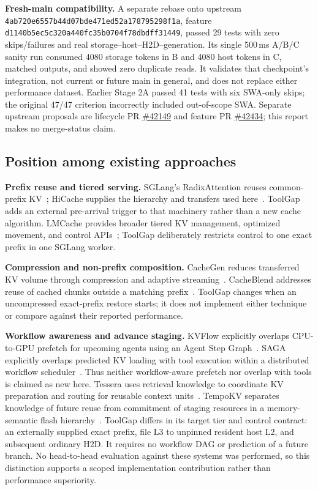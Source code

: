 \documentclass[10pt,a4paper]{article}
\begin{document}
\textbf{Fresh-main compatibility.} A separate rebase onto upstream \nolinkurl{4ab720e6557b44d07bde471ed52a178795298f1a}, feature \nolinkurl{d1140b5ec5c320a440fc35b0704f78dbdff31449}, passed 29 tests with zero skips/failures and real storage--host--H2D--generation. Its single 500\,ms A/B/C sanity run consumed 4080 storage tokens in B and 4080 host tokens in C, matched outputs, and showed zero duplicate reads. It validates that checkpoint's integration, not current or future main in general, and does not replace either performance dataset. Earlier Stage 2A passed 41 tests with six SWA-only skips; the original 47/47 criterion incorrectly included out-of-scope SWA. Separate upstream proposals are lifecycle PR \href{https://github.com/sgl-project/sglang/pull/42149}{\#42149} and feature PR \href{https://github.com/sgl-project/sglang/pull/42434}{\#42434}; this report makes no merge-status claim.

\subsection{Position among existing approaches}
\textbf{Prefix reuse and tiered serving.} SGLang's RadixAttention reuses common-prefix KV~\cite{sglang}; HiCache supplies the hierarchy and transfers used here~\cite{hicache}. ToolGap adds an external pre-arrival trigger to that machinery rather than a new cache algorithm. LMCache provides broader tiered KV management, optimized movement, and control APIs~\cite{lmcache}; ToolGap deliberately restricts control to one exact prefix in one SGLang worker.

\textbf{Compression and non-prefix composition.} CacheGen reduces transferred KV volume through compression and adaptive streaming~\cite{cachegen}. CacheBlend addresses reuse of cached chunks outside a matching prefix~\cite{cacheblend}. ToolGap changes when an uncompressed exact-prefix restore starts; it does not implement either technique or compare against their reported performance.

\textbf{Workflow awareness and advance staging.} KVFlow explicitly overlaps CPU-to-GPU prefetch for upcoming agents using an Agent Step Graph~\cite{kvflow}. SAGA explicitly overlaps predicted KV loading with tool execution within a distributed workflow scheduler~\cite{saga}. Thus neither workflow-aware prefetch nor overlap with tools is claimed as new here. Tessera uses retrieval knowledge to coordinate KV preparation and routing for reusable context units~\cite{tessera}. TempoKV separates knowledge of future reuse from commitment of staging resources in a memory-semantic flash hierarchy~\cite{tempokv}. ToolGap differs in its target tier and control contract: an externally supplied exact prefix, file L3 to unpinned resident host L2, and subsequent ordinary H2D. It requires no workflow DAG or prediction of a future branch. No head-to-head evaluation against these systems was performed, so this distinction supports a scoped implementation contribution rather than performance superiority.
\end{document}

